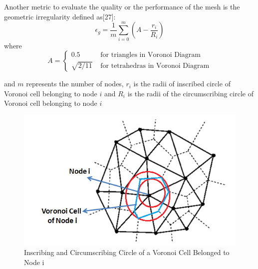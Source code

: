 \documentclass[twoside]{article}
\begin{document}
	
	Another metric to evaluate the quality or the performance of the mesh is the geometric irregularity defined as[27]:
	\begin{equation}
\epsilon _g = \frac{1}{m} \sum_{i = 0}^{m} (A-\frac{r_i}{R_i})
	\end{equation}
	where 
		\begin{equation}
		A = \left\{ \begin{array}{rl}
		0.5                               &\mbox{ for triangles in Voronoi Diagram} \\
		\sqrt{2/11}                   &\mbox{ for tetrahedras in Voronoi Diagram}
		\end{array} \right.
		\end{equation}
		
		and $m$ represents the number of nodes, $r_i$ is the radii of inscribed circle of Voronoi cell belonging to node $i$ and $R_i$ is the radii of the circumscribing circle of Voronoi cell belonging to node $i$
	

		\begin{figure}[H]
			\caption{Inscribing and Circumscribing Circle of a Voronoi Cell Belonged to Node i}
			\centering
			\includegraphics[scale = 0.70]{voronoi2}
		\end{figure}
	
	
\end{document}
